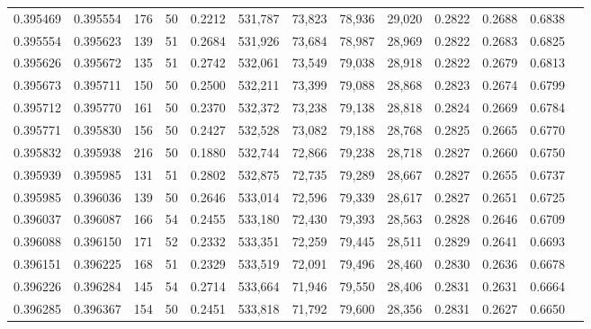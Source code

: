 \begin{tabular}{rrrrrrrrrrrrr}
0.395469 & 0.395554 &   176 &  50 &                                     0.2212 & 531,787 &  73,823 &  78,936 &  29,020 & 0.2822 & 0.2688 & 0.6838 \\
0.395554 & 0.395623 &   139 &  51 &                                     0.2684 & 531,926 &  73,684 &  78,987 &  28,969 & 0.2822 & 0.2683 & 0.6825 \\
0.395626 & 0.395672 &   135 &  51 &                                     0.2742 & 532,061 &  73,549 &  79,038 &  28,918 & 0.2822 & 0.2679 & 0.6813 \\
0.395673 & 0.395711 &   150 &  50 &                                     0.2500 & 532,211 &  73,399 &  79,088 &  28,868 & 0.2823 & 0.2674 & 0.6799 \\
0.395712 & 0.395770 &   161 &  50 &                                     0.2370 & 532,372 &  73,238 &  79,138 &  28,818 & 0.2824 & 0.2669 & 0.6784 \\
0.395771 & 0.395830 &   156 &  50 &                                     0.2427 & 532,528 &  73,082 &  79,188 &  28,768 & 0.2825 & 0.2665 & 0.6770 \\
0.395832 & 0.395938 &   216 &  50 &                                     0.1880 & 532,744 &  72,866 &  79,238 &  28,718 & 0.2827 & 0.2660 & 0.6750 \\
0.395939 & 0.395985 &   131 &  51 &                                     0.2802 & 532,875 &  72,735 &  79,289 &  28,667 & 0.2827 & 0.2655 & 0.6737 \\
0.395985 & 0.396036 &   139 &  50 &                                     0.2646 & 533,014 &  72,596 &  79,339 &  28,617 & 0.2827 & 0.2651 & 0.6725 \\
0.396037 & 0.396087 &   166 &  54 &                                     0.2455 & 533,180 &  72,430 &  79,393 &  28,563 & 0.2828 & 0.2646 & 0.6709 \\
0.396088 & 0.396150 &   171 &  52 &                                     0.2332 & 533,351 &  72,259 &  79,445 &  28,511 & 0.2829 & 0.2641 & 0.6693 \\
0.396151 & 0.396225 &   168 &  51 &                                     0.2329 & 533,519 &  72,091 &  79,496 &  28,460 & 0.2830 & 0.2636 & 0.6678 \\
0.396226 & 0.396284 &   145 &  54 &                                     0.2714 & 533,664 &  71,946 &  79,550 &  28,406 & 0.2831 & 0.2631 & 0.6664 \\
0.396285 & 0.396367 &   154 &  50 &                                     0.2451 & 533,818 &  71,792 &  79,600 &  28,356 & 0.2831 & 0.2627 & 0.6650 \\

\end{tabular}
